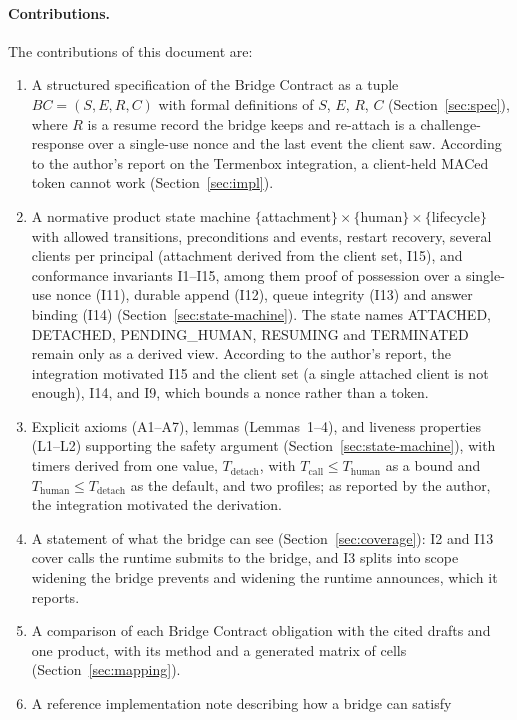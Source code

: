 \paragraph{Contributions.} The contributions of this document are:
\begin{enumerate}[leftmargin=2em]
\item A structured specification of the Bridge Contract as a tuple
$BC = (S, E, R, C)$ with formal definitions of $S$, $E$, $R$, $C$
(Section~\ref{sec:spec}), where $R$ is a resume record the bridge keeps
and re-attach is a challenge-response over a single-use nonce and the
last event the client saw. According to the author's report on the Termenbox integration, a
client-held MACed token cannot work (Section~\ref{sec:impl}).
\item A normative product state machine
$\{$attachment$\} \times \{$human$\} \times \{$lifecycle$\}$ with
allowed transitions, preconditions and events, restart recovery, several
clients per principal (attachment derived from the client set, I15), and
conformance invariants I1--I15, among them proof of possession over a
single-use nonce (I11), durable append (I12), queue integrity (I13) and
answer binding (I14) (Section~\ref{sec:state-machine}). The state
names ATTACHED, DETACHED, PENDING\_HUMAN, RESUMING and TERMINATED remain
only as a derived view. According to the author's report, the integration motivated I15 and the client set
(a single attached client is not enough), I14, and I9, which bounds a
nonce rather than a token.
\item Explicit axioms (A1--A7), lemmas
(Lemmas~1--4), and liveness properties (L1--L2) supporting the safety
argument (Section~\ref{sec:state-machine}), with timers derived from
one value, $T_{\text{detach}}$, with $T_{\text{call}} \le T_{\text{human}}$ as a
bound and $T_{\text{human}} \le T_{\text{detach}}$ as the default,
and two profiles; as reported by the author, the integration motivated the derivation.
\item A statement of what the bridge can see (Section~\ref{sec:coverage}):
I2 and I13 cover calls the runtime submits to the bridge, and I3 splits
into scope widening the bridge prevents and widening the runtime
announces, which it reports.
\item A comparison of each Bridge Contract obligation with the cited drafts
and one product, with its method and a generated matrix of cells
(Section~\ref{sec:mapping}).
\item A reference implementation note describing how a bridge can satisfy

\end{enumerate}
